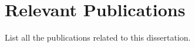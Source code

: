 \section{Relevant Publications}
\label{sec:conclusions:pub}

List all the publications related to this dissertation.